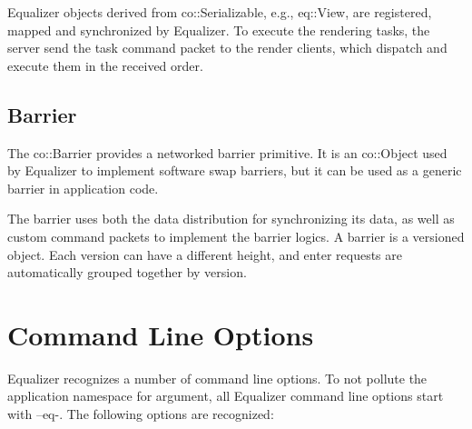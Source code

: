 \documentclass[10pt,a4]{scrartcl}
\begin{document}
Equalizer objects derived from \textsf{co::Serializable}, e.g.,
\textsf{eq::View}, are registered, mapped and synchronized by Equalizer. To
execute the rendering tasks, the server send the task command packet to the
render clients, which dispatch and execute them in the received order.

\subsection{Barrier}

The \textsf{co::Barrier} provides a networked barrier primitive. It is an
\textsf{co::Object} used by Equalizer to implement software swap barriers, but
it can be used as a generic barrier in application code.

The barrier uses both the data distribution for synchronizing its data,
as well as custom command packets to implement the barrier logics. A
barrier is a versioned object. Each version can have a different height,
and enter requests are automatically grouped together by version.


\newpage
\appendix
\section{Command Line Options}

Equalizer recognizes a number of command line options. To not pollute the
application namespace for argument, all Equalizer command line options start
with \textsf{--eq-}. The following options are recognized:
\end{document}

